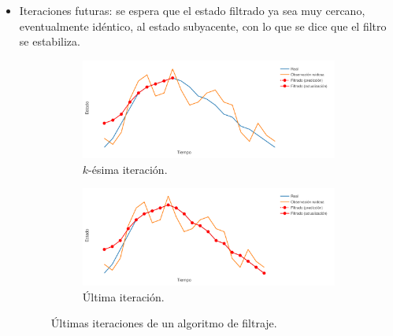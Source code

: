 \begin{itemize}
\begin{figure}[h!]
    \end{figure}
    \item Iteraciones futuras: se espera que el estado filtrado ya sea muy cercano, eventualmente idéntico, al estado subyacente, con lo que se dice que el filtro se estabiliza.
    \begin{figure}[h!]
        \centering
        \begin{subfigure}[b]{.49\linewidth}
        \centering
            \includegraphics[width=\linewidth]{img/content/chapter2/filt25.pdf}
            \caption{$k$-ésima iteración.}
        \end{subfigure}
        \begin{subfigure}[b]{.49\linewidth}
        \centering
            \includegraphics[width=\linewidth]{img/content/chapter2/filt26.pdf}
            \caption{Última iteración.}
        \end{subfigure}
        \caption{Últimas iteraciones de un algoritmo de filtraje.}
    \end{figure}
\end{itemize}

